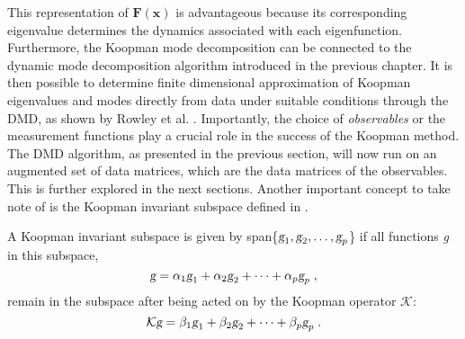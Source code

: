% 
This representation of $\mathbf{F(x)}$ is advantageous because its corresponding eigenvalue determines the dynamics associated with each eigenfunction. \\
Furthermore, the Koopman mode decomposition can be connected to the dynamic mode decomposition algorithm introduced in the previous chapter. It is then possible to determine finite dimensional approximation of Koopman eigenvalues and modes directly from data under suitable conditions through the DMD, as shown by Rowley et al. \cite{rowley_mezic}. Importantly, the choice of \textit{observables} or the measurement functions play a crucial role in the success of the Koopman method. The DMD algorithm, as presented in the previous section, will now run on an augmented set of data matrices, which are the data matrices of the observables. This is further explored in the next sections.
\newpage
Another important concept to take note of is the Koopman invariant subspace defined in \cite{Brunton_K_invariant_sub}. 
\begin{definition}
A Koopman invariant subspace is given by span\{$\textsl{g}_1, \textsl{g}_2,\dots,\textsl{g}_p$\} if all functions \textsl{g} in this subspace,
\begin{equation}
    \textsl{g} = \alpha_1\textsl{g}_1 + \alpha_2\textsl{g}_2+\dots+\alpha_p\textsl{g}_p\;,
\end{equation}
remain in the subspace after being acted on by the Koopman operator $\mathcal{K}$:
\begin{equation}
    \mathcal{K}\textsl{g} = \beta_1\textsl{g}_1 + \beta_2\textsl{g}_2 + \dots + \beta_p\textsl{g}_p \;.
\end{equation}
\end{definition}
